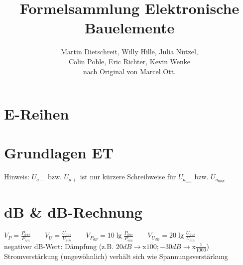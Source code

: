 

\newcommand*{\bfrac}[2]{\genfrac{}{}{0pt}{}{#1}{#2}}
\setlength{\extrarowheight}{2pt}


    \frontmatter
    \title{Formelsammlung Elektronische Bauelemente}
    \author{Martin Dietschreit, Willy Hille, Julia Nützel,\\Colin Pohle, Eric Richter, Kevin Wenke\\nach Original von Marcel Ott.}
    \maketitle
    \tableofcontents

    \mainmatter
    \section{E-Reihen}
    

    \section{Grundlagen ET}
    
    Hinweis: $U_{a-}$ bzw. $U_{a+}$ ist nur kürzere Schreibweise für $U_{a_{\min}}$ bzw. $U_{a_{\max}}$

    \section{dB \& dB-Rechnung} %
        $V_P=\frac{P_{aus}}{P_{ein}}\quad\quad V_U=\frac{U_{aus}}{U_{ein}}\quad\quad V_{P_{dB}}=10\lg\frac{P_{aus}}{P_{ein}}\quad\quad V_{U_{dB}}=20\lg\frac{U_{aus}}{U_{ein}}$ \\
    negativer dB-Wert: Dämpfung (z.B. $20dB\rightarrow $x$100; -30dB\rightarrow $x$\frac{1}{1000}$)\\
    Stromverstärkung (ungewöhnlich) verhält sich wie Spannungsverstärkung\\

